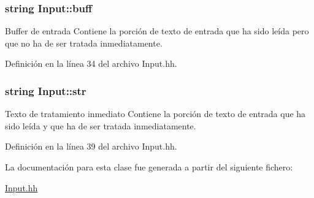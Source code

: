 \subsubsection[{\texorpdfstring{buff}{buff}}]{\setlength{\rightskip}{0pt plus 5cm}string Input\+::buff\hspace{0.3cm}{\ttfamily [private]}}\hypertarget{class_input_a680019c05e47ad35677d5cb692978d98}{}\label{class_input_a680019c05e47ad35677d5cb692978d98}


Buffer de entrada Contiene la porción de texto de entrada que ha sido leída pero que no ha de ser tratada inmediatamente. 



Definición en la línea 34 del archivo Input.\+hh.

\subsubsection[{\texorpdfstring{str}{str}}]{\setlength{\rightskip}{0pt plus 5cm}string Input\+::str\hspace{0.3cm}{\ttfamily [private]}}\hypertarget{class_input_a0c2550eda9a6250028748d8870f4e83f}{}\label{class_input_a0c2550eda9a6250028748d8870f4e83f}


Texto de tratamiento inmediato Contiene la porción de texto de entrada que ha sido leída y que ha de ser tratada inmediatamente. 



Definición en la línea 39 del archivo Input.\+hh.



La documentación para esta clase fue generada a partir del siguiente fichero\+:\begin{DoxyCompactItemize}
\item 
\hyperlink{_input_8hh}{Input.\+hh}\end{DoxyCompactItemize}

